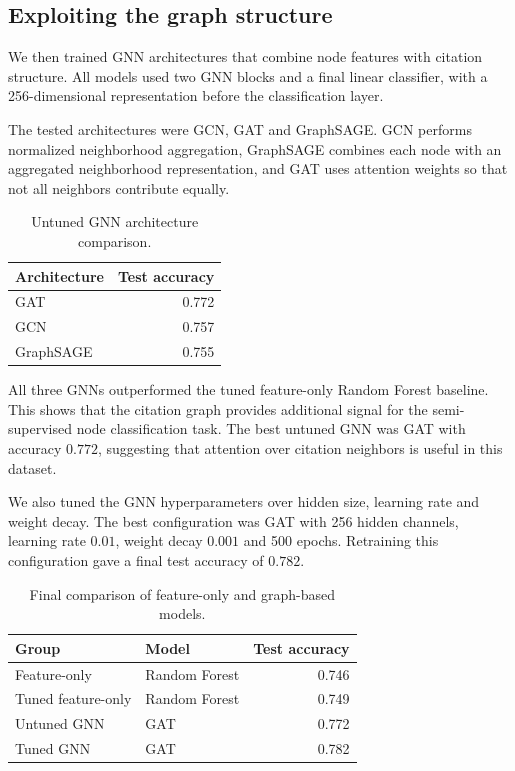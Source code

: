 \documentclass[11pt]{article}
\begin{document}
\subsection{Exploiting the graph structure}

We then trained GNN architectures that combine node features with citation structure. All models used two GNN blocks and a final linear classifier, with a 256-dimensional representation before the classification layer.

The tested architectures were GCN, GAT and GraphSAGE. GCN performs normalized neighborhood aggregation, GraphSAGE combines each node with an aggregated neighborhood representation, and GAT uses attention weights so that not all neighbors contribute equally.

\begin{table}[H]
\centering
\caption{Untuned GNN architecture comparison.}
\begin{tabular}{lr}
\toprule
Architecture & Test accuracy \\
\midrule
GAT & 0.772 \\
GCN & 0.757 \\
GraphSAGE & 0.755 \\
\bottomrule
\end{tabular}
\end{table}

All three GNNs outperformed the tuned feature-only Random Forest baseline. This shows that the citation graph provides additional signal for the semi-supervised node classification task. The best untuned GNN was GAT with accuracy $0.772$, suggesting that attention over citation neighbors is useful in this dataset.

We also tuned the GNN hyperparameters over hidden size, learning rate and weight decay. The best configuration was GAT with 256 hidden channels, learning rate $0.01$, weight decay $0.001$ and 500 epochs. Retraining this configuration gave a final test accuracy of $0.782$.

\begin{table}[H]
\centering
\caption{Final comparison of feature-only and graph-based models.}
\begin{tabular}{llr}
\toprule
Group & Model & Test accuracy \\
\midrule
Feature-only & Random Forest & 0.746 \\
Tuned feature-only & Random Forest & 0.749 \\
Untuned GNN & GAT & 0.772 \\
Tuned GNN & GAT & 0.782 \\
\bottomrule
\end{tabular}
\end{table}
\end{document}
